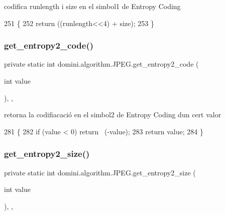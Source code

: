 codifica runlength i size en el simbol1 de Entropy Coding 


\begin{DoxyCode}
251                                                                   \{
252         \textcolor{keywordflow}{return} ((runlength<<4) + size);
253     \}
\end{DoxyCode}
\mbox{\label{classdomini_1_1algorithm_1_1JPEG_a0ccbcda5311dc96a30e5cb7f2a5b95b5}} 
\subsubsection{\texorpdfstring{get\+\_\+entropy2\+\_\+code()}{get\_entropy2\_code()}}
{\footnotesize\ttfamily private static int domini.\+algorithm.\+J\+P\+E\+G.\+get\+\_\+entropy2\+\_\+code (\begin{DoxyParamCaption}\item[{int}]{value }\end{DoxyParamCaption})\hspace{0.3cm}{\ttfamily [inline]}, {\ttfamily [static]}, {\ttfamily [private]}}



retorna la codifiacació en el simbol2 de Entropy Coding d\textquotesingle{}un cert valor 


\begin{DoxyCode}
281                                                     \{
282         \textcolor{keywordflow}{if} (value < 0) \textcolor{keywordflow}{return} ~(-value);
283         \textcolor{keywordflow}{return} value;
284     \}
\end{DoxyCode}
\mbox{\label{classdomini_1_1algorithm_1_1JPEG_aa9bc9bee7181efee254be843e23ee2c6}} 
\subsubsection{\texorpdfstring{get\+\_\+entropy2\+\_\+size()}{get\_entropy2\_size()}}
{\footnotesize\ttfamily private static int domini.\+algorithm.\+J\+P\+E\+G.\+get\+\_\+entropy2\+\_\+size (\begin{DoxyParamCaption}\item[{int}]{value }\end{DoxyParamCaption})\hspace{0.3cm}{\ttfamily [inline]}, {\ttfamily [static]}, {\ttfamily [private]}}



